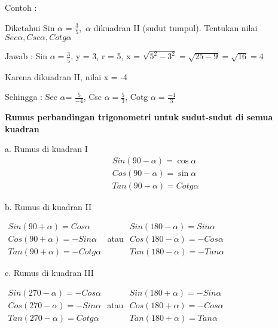 \documentclass[11pt,fleqn]{book} %
\begin{document}
\begin{myEnumerate}
\begin{itemize}
\noindent 

\noindent 

\noindent 

\noindent 

\noindent 

\noindent 

Contoh :

Diketahui Sin $\alpha $ = $\frac{3}{5} ,$  $\alpha $ dikuadran II (sudut tumpul). Tentukan nilai $Sec\alpha ,Csc\alpha ,Cotg\alpha $

\noindent 

Jawab : Sin $\alpha =\frac{3}{5} $,  y = 3, r = 5, x = $\sqrt{5^{2} -3^{2} } =\sqrt{25-9} =\sqrt{16} =4$

Karena dikuadran II, nilai x = -4

Sehingga : Sec $\alpha $= $\frac{5}{-4} $,  Csc $\alpha =\frac{5}{3} $, Cotg $\alpha =\frac{-4}{3} $

\noindent 

\noindent \textbf{Rumus perbandingan trigonometri untuk sudut-sudut di semua kuadran}

\textbf{   }a. Rumus di kuadran I
\[\begin{array}{l} {Sin(90-\alpha )=\cos \alpha } \\ {Cos(90-\alpha )=\sin \alpha } \\ {Tan(90-\alpha )=Cotg\alpha } \end{array}\] 

b. Rumus di kuadran II 

\textbf{$\begin{array}{l} {Sin(90+\alpha )=Cos\alpha } \\ {Cos(90+\alpha )=-Sin\alpha } \\ {Tan(90+\alpha )=-Cotg\alpha } \end{array}$    }atau     \textbf{$\begin{array}{l} {Sin(180-\alpha )=Sin\alpha } \\ {Cos(180-\alpha )=-Cos\alpha } \\ {Tan(180-\alpha )=-Tan\alpha } \end{array}$}



c. Rumus di kuadran III

\noindent \textbf{  $\begin{array}{l} {Sin(270-\alpha )=-Cos\alpha } \\ {Cos(270-\alpha )=-Sin\alpha } \\ {Tan(270-\alpha )=Cotg\alpha } \end{array}$       }atau\textbf{     $\begin{array}{l} {Sin(180+\alpha )=-Sin\alpha } \\ {Cos(180+\alpha )=-Cos\alpha } \\ {Tan(180+\alpha )=Tan\alpha } \end{array}$}


\end{itemize}
\end{myEnumerate}
\end{document}
